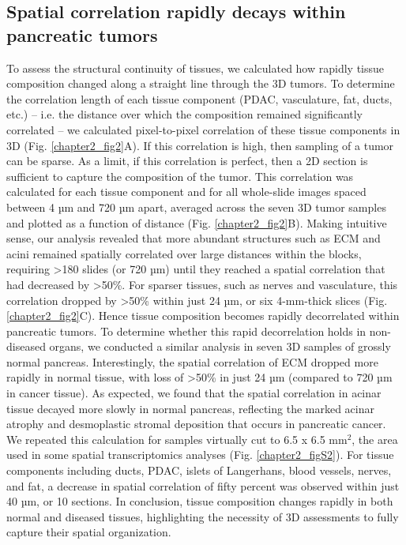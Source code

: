 \begin{refsection}
    \subsection{Spatial correlation rapidly decays within pancreatic tumors}
    To assess the structural continuity of tissues, we calculated how rapidly tissue composition changed along a straight line through the 3D tumors. To determine the correlation length of each tissue component (PDAC, vasculature, fat, ducts, etc.) – i.e. the distance over which the composition remained significantly correlated – we calculated pixel-to-pixel correlation of these tissue components in 3D (Fig. \ref{chapter2_fig2}A). If this correlation is high, then sampling of a tumor can be sparse. As a limit, if this correlation is perfect, then a 2D section is sufficient to capture the composition of the tumor. 
    This correlation was calculated for each tissue component and for all whole-slide images spaced between 4 µm and 720 µm apart, averaged across the seven 3D tumor samples and plotted as a function of distance (Fig. \ref{chapter2_fig2}B). Making intuitive sense, our analysis revealed that more abundant structures such as ECM and acini remained spatially correlated over large distances within the blocks, requiring >180 slides (or 720 µm) until they reached a spatial correlation that had decreased by >50\%. For sparser tissues, such as nerves and vasculature, this correlation dropped by >50\% within just 24 µm, or six 4-mm-thick slices (Fig. \ref{chapter2_fig2}C).  Hence tissue composition becomes rapidly decorrelated within pancreatic tumors.
    To determine whether this rapid decorrelation holds in non-diseased organs, we conducted a similar analysis in seven 3D samples of grossly normal pancreas. Interestingly, the spatial correlation of ECM dropped more rapidly in normal tissue, with loss of >50\% in just 24 µm (compared to 720 µm in cancer tissue). As expected, we found that the spatial correlation in acinar tissue decayed more slowly in normal pancreas, reflecting the marked acinar atrophy and desmoplastic stromal deposition that occurs in pancreatic cancer.
    We repeated this calculation for samples virtually cut to 6.5 x 6.5 mm$^2$, the area used in some spatial transcriptomics analyses (Fig. \ref{chapter2_figS2}). For tissue components including ducts, PDAC, islets of Langerhans, blood vessels, nerves, and fat, a decrease in spatial correlation of fifty percent was observed within just 40 µm, or 10 sections. 
    In conclusion, tissue composition changes rapidly in both normal and diseased tissues, highlighting the necessity of 3D assessments to fully capture their spatial organization.


\end{refsection}
